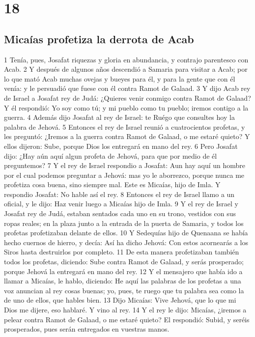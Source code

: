 \chapter{18}

\section*{Micaías profetiza la derrota de Acab}

1 Tenía, pues, Josafat riquezas y gloria en abundancia, y contrajo parentesco con Acab.
2 Y después de algunos años descendió a Samaria para visitar a Acab; por lo que mató Acab muchas ovejas y bueyes para él, y para la gente que con él venía: y le persuadió que fuese con él contra Ramot de Galaad.
3 Y dijo Acab rey de Israel a Josafat rey de Judá: ¿Quieres venir conmigo contra Ramot de Galaad? Y él respondió: Yo soy como tú; y mi pueblo como tu pueblo; iremos contigo a la guerra.
4 Además dijo Josafat al rey de Israel: te Ruégo que consultes hoy la palabra de Jehová.
5 Entonces el rey de Israel reunió a cuatrocientos profetas, y les preguntó: ¿Iremos a la guerra contra Ramot de Galaad, o me estaré quieto? Y ellos dijeron: Sube, porque Dios los entregará en mano del rey.
6 Pero Josafat dijo: ¿Hay aún aquí algun profeta de Jehová, para que por medio de él preguntemos?
7 Y el rey de Israel respondio a Josafat: Aun hay aquí un hombre por el cual podemos preguntar a Jehová: mas yo le aborrezco, porque nunca me profetiza cosa buena, sino siempre mal. Este es Micaías, hijo de Imla. Y respondio Josafat: No hable así el rey.
8 Entonces el rey de Israel llamo a un oficial, y le dijo: Haz venir luego a Micaías hijo de Imla.
9 Y el rey de Israel y Josafat rey de Judá, estaban sentados cada uno en su trono, vestidos con sus ropas reales; en la plaza junto a la entrada de la puerta de Samaria, y todos los profetas profetizaban delante de ellos.
10 Y Sedequías hijo de Quenaana se había hecho cuernos de hierro, y decía: Así ha dicho Jehová: Con estos acornearás a los Siros hasta destruirlos por completo.
11 De esta manera profetizaban también todos los profetas, diciendo: Sube contra Ramot de Galaad, y serás prosperado; porque Jehová la entregará en mano del rey.
12 Y el mensajero que había ido a llamar a Micaías, le hablo, diciendo: He aquí las palabras de los profetas a una voz anuncian al rey cosas buenas; yo, pues, te ruego que tu palabra sea como la de uno de ellos, que hables bien.
13 Dijo Micaías: Vive Jehová, que lo que mi Dios me dijere, eso hablaré. Y vino al rey. 
14 Y el rey le dijo: Micaías, ¿iremos a pelear contra Ramot de Galaad, o me estaré quieto? El respondió: Subid, y seréis prosperados, pues serán entregados en vuestras manos.

